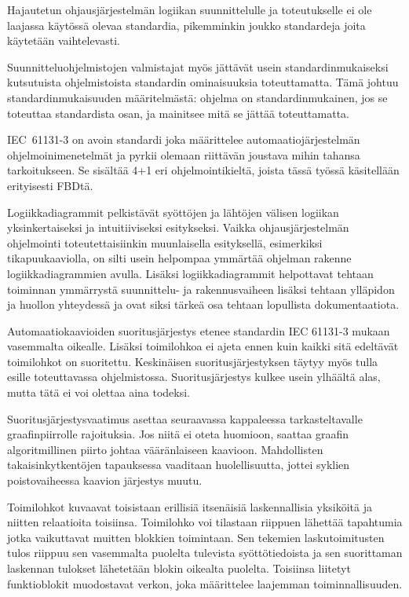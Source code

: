 \documentclass[finnish,12pt]{article}
\begin{document}

Hajautetun ohjausjärjestelmän logiikan suunnittelulle ja toteutukselle ei ole laajassa käytössä olevaa standardia, pikemminkin joukko standardeja joita käytetään vaihtelevasti.

Suunnitteluohjelmistojen valmistajat myös jättävät usein standardinmukaiseksi kutsutuista ohjelmistoista standardin ominaisuuksia toteuttamatta.\cite{RefWorks:42}
Tämä johtuu standardinmukaisuuden määritelmästä: ohjelma on standardinmukainen, jos se toteuttaa standardista osan, ja mainitsee mitä se jättää toteuttamatta. 

IEC~61131-3 on avoin standardi joka määrittelee automaatiojärjestelmän ohjelmoinimenetelmät ja
 pyrkii olemaan riittävän joustava mihin tahansa tarkoitukseen. Se sisältää 4+1 eri
ohjelmointikieltä, joista tässä työssä käsitellään erityisesti FBDtä.

Logiikkadiagrammit pelkistävät syöttöjen ja lähtöjen välisen logiikan
yksinkertaiseksi ja intuitiiviseksi esitykseksi. Vaikka ohjausjärjestelmän
ohjelmointi toteutettaisiinkin muunlaisella esityksellä, esimerkiksi
tikapuukaaviolla, on silti usein helpompaa ymmärtää ohjelman rakenne
logiikkadiagrammien avulla. Lisäksi logiikkadiagrammit helpottavat tehtaan
toiminnan ymmärrystä suunnittelu- ja rakennusvaiheen lisäksi tehtaan ylläpidon
ja huollon yhteydessä ja ovat siksi tärkeä osa tehtaan lopullista
dokumentaatiota.

Automaatiokaavioiden suoritusjärjestys etenee standardin IEC 61131-3 mukaan
vasemmalta oikealle. Lisäksi toimilohkoa ei ajeta ennen kuin kaikki sitä edeltävät toimilohkot on suoritettu.
Keskinäisen suoritusjärjestyksen täytyy myös tulla esille toteuttavassa ohjelmistossa.
Suoritusjärjestys kulkee usein ylhäältä alas, mutta tätä ei voi olettaa aina todeksi.

Suoritusjärjestysvaatimus asettaa seuraavassa kappaleessa tarkasteltavalle graafinpiirrolle rajoituksia.
Jos niitä ei oteta huomioon, saattaa graafin algoritmillinen piirto johtaa vääränlaiseen kaavioon.
Mahdollisten takaisinkytkentöjen tapauksessa vaaditaan huolellisuutta, jottei syklien poistovaiheessa kaavion järjestys muutu.

Toimilohkot kuvaavat toisistaan erillisiä itsenäisiä laskennallisia yksiköitä
ja niitten relaatioita toisiinsa. Toimilohko voi tilastaan riippuen lähettää
tapahtumia jotka vaikuttavat muitten blokkien toimintaan. Sen tekemien
laskutoimitusten tulos riippuu sen vasemmalta puolelta tulevista
syöttötiedoista ja sen suorittaman laskennan tulokset lähetetään blokin oikealta puolelta.
Toisiinsa liitetyt funktioblokit muodostavat verkon, joka määrittelee laajemman toiminnallisuuden.
\end{document}
